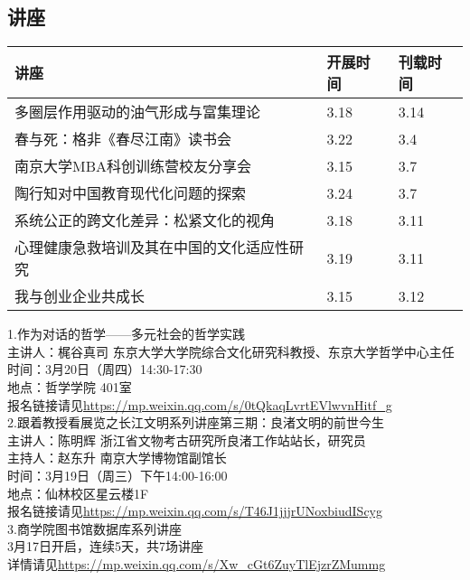\documentclass[letterpaper, 12pt]{article}
\begin{document}
\begin{multicols}{2}
\pagebreak

\section{讲座}
\begin{tabular}{|>{\centering\arraybackslash}m{}|m{}|m{}|}
    \hline
    讲座 & 开展时间 & 刊载时间\\
    \hline\hline
    多圈层作用驱动的油气形成与富集理论 & 3.18 & 3.14\\\hline
    春与死：格非《春尽江南》读书会 & 3.22 & 3.4\\\hline
    南京大学MBA科创训练营校友分享会 & 3.15 & 3.7\\\hline
    陶行知对中国教育现代化问题的探索 & 3.24 & 3.7\\\hline
    系统公正的跨文化差异：松紧文化的视角 & 3.18 & 3.11\\\hline
    心理健康急救培训及其在中国的文化适应性研究 & 3.19 & 3.11\\\hline
    我与创业企业共成长 & 3.15 & 3.12\\\hline
\end{tabular}
1.作为对话的哲学——多元社会的哲学实践\\
主讲人：梶谷真司 东京大学大学院综合文化研究科教授、东京大学哲学中心主任\\
时间：3月20日（周四）14:30-17:30\\
地点：哲学学院 401室\\
报名链接请见\url{https://mp.weixin.qq.com/s/0tQkaqLvrtEVlwvnHitf_g}\\

2.跟着教授看展览之长江文明系列讲座第三期：良渚文明的前世今生\\
主讲人：陈明辉 浙江省文物考古研究所良渚工作站站长，研究员\\
主持人：赵东升 南京大学博物馆副馆长\\
时间：3月19日（周三）下午14:00-16:00\\
地点：仙林校区星云楼1F\\
报名链接请见\url{https://mp.weixin.qq.com/s/T46J1jjjrUNoxbiudIScyg}\\

3.商学院图书馆数据库系列讲座\\
3月17日开启，连续5天，共7场讲座\\
详情请见\url{https://mp.weixin.qq.com/s/Xw_cGt6ZuyTlEjzrZMummg}\\


\end{multicols}
\end{document}
